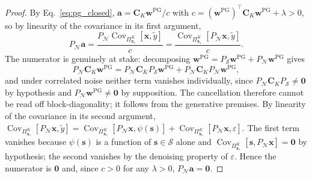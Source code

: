 \documentclass[pdflatex,sn-mathphys-num]{sn-jnl}
\theoremstyle{thmstyleone}
\theoremstyle{thmstyletwo}%
\theoremstyle{thmstylethree}%
\begin{document}
\begin{proof}
By Eq.~\eqref{eq:pg_closed}, $\mathbf{a} = \mathbf{C}_K\mathbf{w}^{\text{PG}} / c$ with $c = (\mathbf{w}^{\text{PG}})^\top \mathbf{C}_K \mathbf{w}^{\text{PG}} + \lambda > 0$, so by linearity of the covariance in its first argument,
\begin{equation*}
    P_{\mathcal{N}}\mathbf{a} = \frac{P_{\mathcal{N}}\operatorname{Cov}_{\Pi^K_{\mathbf{x}_\star}}[\mathbf{x}, \tilde{y}]}{c} = \frac{\operatorname{Cov}_{\Pi^K_{\mathbf{x}_\star}}[P_{\mathcal{N}}\mathbf{x}, \tilde{y}]}{c}.
\end{equation*}
The numerator is genuinely at stake: decomposing $\mathbf{w}^{\text{PG}} = P_{\mathcal{S}}\mathbf{w}^{\text{PG}} + P_{\mathcal{N}}\mathbf{w}^{\text{PG}}$ gives
\begin{equation*}
    P_{\mathcal{N}}\mathbf{C}_K\mathbf{w}^{\text{PG}} = P_{\mathcal{N}}\mathbf{C}_K P_{\mathcal{S}}\mathbf{w}^{\text{PG}} + P_{\mathcal{N}}\mathbf{C}_K P_{\mathcal{N}}\mathbf{w}^{\text{PG}},
\end{equation*}
and under correlated noise neither term vanishes individually, since $P_{\mathcal{N}}\mathbf{C}_K P_{\mathcal{S}} \neq \mathbf{0}$ by hypothesis and $P_{\mathcal{N}}\mathbf{w}^{\text{PG}} \neq \mathbf{0}$ by supposition. The cancellation therefore cannot be read off block-diagonality; it follows from the generative premises. By linearity of the covariance in its second argument, $\operatorname{Cov}_{\Pi^K_{\mathbf{x}_\star}}[P_{\mathcal{N}}\mathbf{x}, \tilde{y}] = \operatorname{Cov}_{\Pi^K_{\mathbf{x}_\star}}[P_{\mathcal{N}}\mathbf{x}, \psi(\mathbf{s})] + \operatorname{Cov}_{\Pi^K_{\mathbf{x}_\star}}[P_{\mathcal{N}}\mathbf{x}, \varepsilon]$. The first term vanishes because $\psi(\mathbf{s})$ is a function of $\mathbf{s} \in \mathcal{S}$ alone and $\operatorname{Cov}_{\Pi^K_{\mathbf{x}_\star}}[\mathbf{s}, P_{\mathcal{N}}\mathbf{x}] = \mathbf{0}$ by hypothesis; the second vanishes by the denoising property of $\varepsilon$. Hence the numerator is $\mathbf{0}$ and, since $c > 0$ for any $\lambda > 0$, $P_{\mathcal{N}}\mathbf{a} = \mathbf{0}$.
\end{proof}
\end{document}
